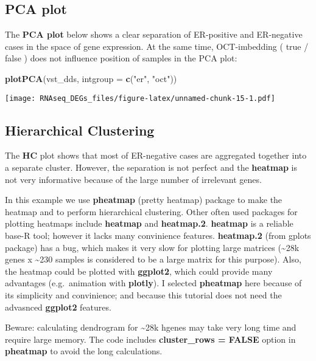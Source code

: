 \documentclass[]{book}
\newenvironment{Shaded}{\begin{snugshade}}{\end{snugshade}}
\newcommand{\KeywordTok}[1]{\textcolor[rgb]{0.13,0.29,0.53}{\textbf{#1}}}
\newcommand{\DataTypeTok}[1]{\textcolor[rgb]{0.13,0.29,0.53}{#1}}
\newcommand{\StringTok}[1]{\textcolor[rgb]{0.31,0.60,0.02}{#1}}
\newcommand{\NormalTok}[1]{#1}
\begin{document}
\subsection{PCA plot}\label{pca-plot}

The \textbf{PCA plot} below shows a clear separation of ER-positive and
ER-negative cases in the space of gene expression. At the same time,
OCT-imbedding ( true / false ) does not influence position of samples in
the PCA plot:

\begin{Shaded}
\begin{Highlighting}[]
\KeywordTok{plotPCA}\NormalTok{(vst_dds, }\DataTypeTok{intgroup =} \KeywordTok{c}\NormalTok{(}\StringTok{"er"}\NormalTok{, }\StringTok{"oct"}\NormalTok{))}
\end{Highlighting}
\end{Shaded}

\texttt{[image: RNAseq\_DEGs\_files/figure-latex/unnamed-chunk-15-1.pdf]}

\subsection{Hierarchical Clustering}\label{hierarchical-clustering}

The \textbf{HC} plot shows that most of ER-negative cases are aggregated
together into a separate cluster. However, the separation is not perfect
and the \textbf{heatmap} is not very informative because of the large
number of irrelevant genes.

In this example we use \textbf{pheatmap} (pretty heatmap) package to
make the heatmap and to perform hierarchical clustering. Other often
used packages for plotting heatmaps include \textbf{heatmap} and
\textbf{heatmap.2}. \textbf{heatmap} is a reliable base-R tool; however
it lacks many convinience features. \textbf{heatmap.2} (from gplots
package) has a bug, which makes it very slow for plotting large matrices
(\textasciitilde{}28k genes x \textasciitilde{}230 samples is considered
to be a large matrix for this purpose). Also, the heatmap could be
plotted with \textbf{ggplot2}, which could provide many advantages
(e.g.~animation with \textbf{plotly}). I selected \textbf{pheatmap} here
because of its simplicity and convinience; and because this tutorial
does not need the advasnced \textbf{ggplot2} features.

Beware: calculating dendrogram for \textasciitilde{}28k hgenes may take
very long time and require large memory. The code includes
\textbf{cluster\_rows = FALSE} option in \textbf{pheatmap} to avoid the
long calculations.
\end{document}
